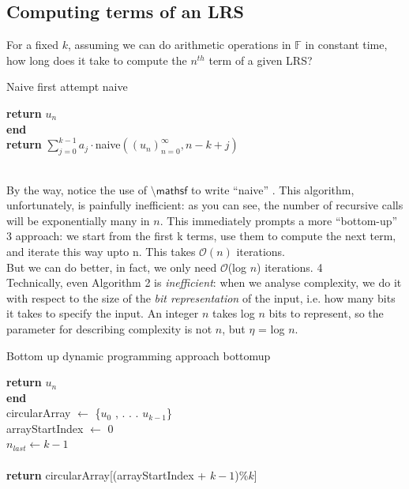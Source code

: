 \documentclass[a4paper,12pt]{article}
\numberwithin{definition}{section}
\numberwithin{mytheorem}{subsection}
\begin{document}
\subsection{Computing terms of an LRS}
For a fixed $k$, assuming we can do arithmetic operations in $\mathbb{F}$ in constant time, how long does it
take to compute the $n^{th}$ term of a given LRS?\\
\begin{algorithm}[ht]
\caption{Naive first attempt \textsf{naive}}
\SetAlgoLined
\DontPrintSemicolon
{}
{\textbf{return} $u_n$}\\
\textbf{end}\\
\textbf{return} $\sum_{j=0}^{k-1} a_{j}\cdot$\textsf{naive}$((u_n)^\infty_{n=0}, n - k + j)$ 
\end{algorithm}\\
By the way, notice the use of $\textsf{\textbackslash mathsf}$ to write \textsf {“naive”} . This algorithm, unfortunately, is painfully
inefficient: as you can see, the number of recursive calls will be exponentially many in $n$. This
immediately prompts a more “bottom-up” 3 approach: we start from the first k terms, use them
to compute the next term, and iterate this way upto n. This takes $\mathcal{O}(n)$ iterations.\\
But we can do better, in fact, we only need $\mathcal{O}$(log $n$) iterations. 4\\
Technically, even Algorithm 2 is \emph{inefficient}: when we analyse complexity, we do it with respect to
the size of the \emph{bit representation} of the input, i.e. how many bits it takes to specify the input. An
integer $n$ takes log $n$ bits to represent, so the parameter for describing complexity is not $n$, but
$\eta$ = log $n$.\\
\begin{algorithm}[ht]
\caption{Bottom up dynamic programming approach  \textsf{bottomup}}
\SetAlgoLined
\DontPrintSemicolon
{}
{\textbf{return} $u_n$}\\
\textbf{end}\\
\textsf{circularArray} $\longleftarrow$ \{$u_0$ , . . . $u_{k−1}$\}\\
\textsf{arrayStartIndex} $\longleftarrow$ 0\\
$n_{last}\longleftarrow k - 1$\\
\\
\textbf{return} \textsf{circularArray[(arrayStartIndex} + $k - 1$\textsf{)}\%$k$\textsf{]}
\end{algorithm}
\end{document}
